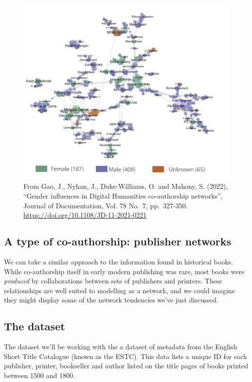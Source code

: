 \documentclass[
]{book}
\begin{document}
\begin{figure}
\centering
\includegraphics[width=6.25in,height=\textheight]{images/co-authorship.png}
\caption{From Gao, J., Nyhan, J., Duke-Williams, O. and Mahony, S. (2022), ``Gender influences in Digital Humanities co-authorship networks'', Journal of Documentation, Vol. 78 No.~7, pp.~327-350. \url{https://doi.org/10.1108/JD-11-2021-0221}}
\end{figure}

\hypertarget{a-type-of-co-authorship-publisher-networks}{%
\subsection{A type of co-authorship: publisher networks}\label{a-type-of-co-authorship-publisher-networks}}

We can take a similar approach to the information found in historical books. While co-authorship itself in early modern publishing was rare, most books were \emph{produced} by collaborations between sets of publishers and printers. These relationships are well suited to modelling as a network, and we could imagine they might display some of the network tendencies we've just discussed.

\hypertarget{the-dataset}{%
\subsection{The dataset}\label{the-dataset}}

The dataset we'll be working with the a dataset of metadata from the English Short Title Catalogue (known as the ESTC). This data lists a unique ID for each publisher, printer, bookseller and author listed on the title pages of books printed between 1500 and 1800.
\end{document}
